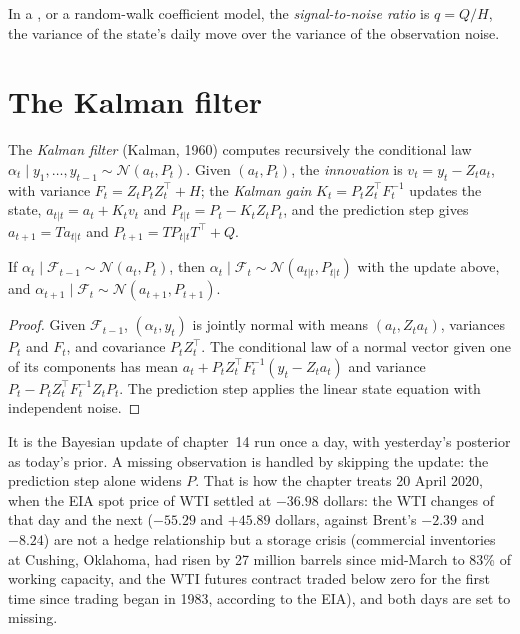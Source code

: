 \begin{definition}\label{def:qm:state-space-models-and-the-kalman-filter:snr}
In a , or a random-walk coefficient model, the \emph{signal-to-noise ratio} is $q = Q/H$, the variance of the
state's daily move over the variance of the observation noise.
\end{definition}

\section{The Kalman filter}

\begin{definition}\label{def:qm:state-space-models-and-the-kalman-filter:kf}
The \emph{Kalman filter} (Kalman, 1960) computes recursively the conditional law $\alpha_t \mid y_1, \dots, y_{t-1} \sim \mathcal N(a_t, P_t)$.
Given $(a_t, P_t)$, the \emph{innovation} is $v_t = y_t - Z_ta_t$, with variance $F_t = Z_tP_tZ_t^\top + H$; the \emph{Kalman gain}
$K_t = P_tZ_t^\top F_t^{-1}$ updates the state, $a_{t|t} = a_t + K_tv_t$ and $P_{t|t} = P_t - K_tZ_tP_t$, and the prediction step gives $a_{t+1} = Ta_{t|t}$ and
$P_{t+1} = TP_{t|t}T^\top + Q$.
\end{definition}

\begin{proposition}\label{prop:qm:state-space-models-and-the-kalman-filter:kf}
If $\alpha_t \mid \mathcal F_{t-1} \sim \mathcal N(a_t, P_t)$, then $\alpha_t \mid \mathcal F_t \sim \mathcal N(a_{t|t}, P_{t|t})$ with the update above, and
$\alpha_{t+1} \mid \mathcal F_t \sim \mathcal N(a_{t+1}, P_{t+1})$.
\end{proposition}

\begin{proof}
Given $\mathcal F_{t-1}$, $(\alpha_t, y_t)$ is jointly normal with means $(a_t, Z_ta_t)$, variances $P_t$ and $F_t$, and covariance $P_tZ_t^\top$. The
conditional law of a normal vector given one of its components has mean $a_t + P_tZ_t^\top F_t^{-1}(y_t - Z_ta_t)$ and variance $P_t - P_tZ_t^\top
F_t^{-1}Z_tP_t$. The prediction step applies the linear state equation with independent noise.
\end{proof}

It is the Bayesian update of chapter~14 run once a day, with yesterday's posterior as today's prior. A missing observation is handled by skipping the
update: the prediction step alone widens $P$. That is how the chapter treats 20 April 2020, when the EIA spot price of WTI settled at $-36.98$ dollars:
the WTI changes of that day and the next ($-55.29$ and $+45.89$ dollars, against Brent's $-2.39$ and $-8.24$) are not a hedge relationship but a storage
crisis (commercial inventories at Cushing, Oklahoma, had risen by 27 million barrels since mid-March to 83\% of working capacity, and the WTI futures
contract traded below zero for the first time since trading began in 1983, according to the EIA), and both days are set to missing.


